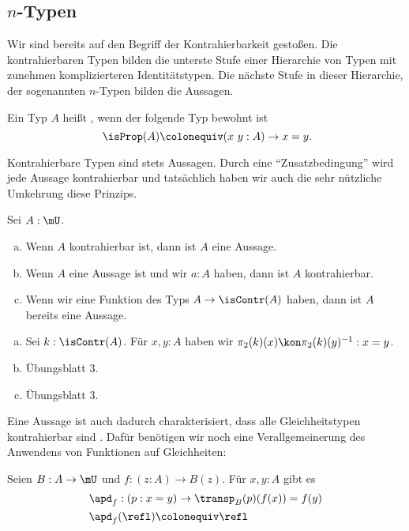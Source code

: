 \subsection{$n$-Typen}

Wir sind bereits auf den Begriff der Kontrahierbarkeit gestoßen.
Die kontrahierbaren Typen bilden die unterste Stufe einer Hierarchie
von Typen mit zunehmen komplizierteren Identitätstypen.
Die nächste Stufe in dieser Hierarchie, der sogenannten $n$-Typen bilden die Aussagen.

\begin{definition}
  Ein Typ $A$ heißt , wenn der folgende Typ bewohnt ist
  \[
    \isProp(A)\colonequiv (x\ y : A)\to x=y\rlap{.}
  \]
\end{definition}

Kontrahierbare Typen sind stets Aussagen.
Durch eine ``Zusatzbedingung'' wird jede Aussage kontrahierbar und tatsächlich haben wir auch die sehr nützliche Umkehrung diese Prinzips.

\begin{bemerkung}
  Sei $A:\mU$.
  \begin{enumerate}[(a)]
  \item Wenn $A$ kontrahierbar ist, dann ist $A$ eine Aussage.
  \item Wenn $A$ eine Aussage ist und wir $a:A$ haben, dann ist $A$ kontrahierbar.
  \item Wenn wir eine Funktion des Typs $A\to \isContr(A)$ haben, dann ist $A$ bereits eine Aussage. 
  \end{enumerate}
\end{bemerkung}

\begin{beweis}
  \begin{enumerate}[(a)]
  \item Sei $k:\isContr(A)$. Für $x,y:A$ haben wir $\pi_2(k)(x)\kon\pi_2(k)(y)^{-1}:x=y$.
  \item Übungsblatt 3.
  \item Übungsblatt 3.
  \end{enumerate}
\end{beweis}

Eine Aussage ist auch dadurch charakterisiert, dass alle Gleichheitstypen kontrahierbar sind .
Dafür benötigen wir noch eine Verallgemeinerung des Anwendens von Funktionen auf Gleichheiten:

\begin{definition}
  Seien $B:A\to \mU$ und $f:(z:A)\to B(z)$.
  Für $x,y:A$ gibt es
  \begin{align*}
    &\apd_f : (p:x=y) \to \transp_B(p)(f(x))=f(y) \\
    &\apd_f(\refl)\colonequiv \refl
  \end{align*}
\end{definition}

